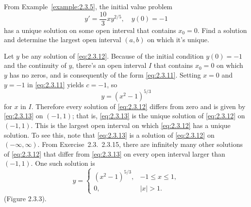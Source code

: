 \setcounter{example}{6}
\setcounter{equation}{11}
\begin{example}
  \label{example:2.3.7} \rm From Example~\ref{example:2.3.5}, the initial value problem
  \begin{equation}
    \label{eq:2.3.12}y'=\frac{10}{3}xy^{2/5},\quad y(0)=-1
  \end{equation}
  has a unique solution on some open interval that contains $x_{0}=0$. Find a solution and determine
  the largest open interval $(a,b)$ on which it's unique.
\end{example}
\setcounter{equation}{12}
\begin{examplesolution}
\solution Let $y$ be any solution of \eqref{eq:2.3.12}. Because of the initial condition $y(0)=-1$
and the continuity of $y$, there's an open interval $I$ that contains $x_{0}=0$ on which $y$ has no
zeros, and is consequently of the form \eqref{eq:2.3.11}. Setting $x=0$ and $y=-1$ in
\eqref{eq:2.3.11} yields $c=-1$, so
\begin{equation}
  \label{eq:2.3.13}y=(x^{2}-1)^{5/3}
\end{equation}
for $x$ in $I$. Therefore every solution of \eqref{eq:2.3.12} differs from zero and is given by
\eqref{eq:2.3.13} on $(-1,1)$; that is, \eqref{eq:2.3.13} is the unique solution of
\eqref{eq:2.3.12} on $(-1,1)$. This is the largest open interval on which \eqref{eq:2.3.12} has a
unique solution. To see this, note that \eqref{eq:2.3.13} is a solution of \eqref{eq:2.3.12} on
$(-\infty,\infty)$. From Exercise~2.3.~\hspace*{-3pt}2.3.15, there are infinitely many
other solutions of \eqref{eq:2.3.12} that differ from \eqref{eq:2.3.13} on every open interval
larger than $(-1,1)$. One such solution is
\[
  y=\left\{
  \begin{array}{cl}
    (x^{2}-1)^{5/3}, & -1\le x\le1, \\[6pt]
    0,               & |x|>1.
  \end{array}\right.
\]
(Figure 2.3.3).
\end{examplesolution}

